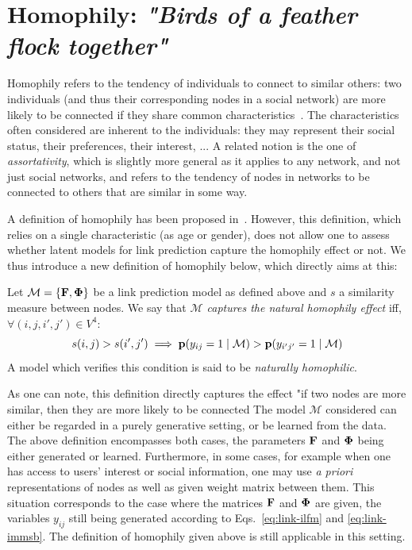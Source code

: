 \section{Homophily: \emph{"Birds of a feather flock together"}}
\label{sec:homophily}

Homophily refers to the tendency of individuals to connect to similar others: two individuals (and thus their corresponding nodes in a social network) are more likely to be connected if they share common characteristics~\cite{mcpherson2001birds,lazarsfeld1954friendship}. The characteristics often considered are inherent to the individuals: they may represent their social status, their preferences, their interest, ... A related notion is the one of {\it assortativity}, which is slightly more general as it applies to any network, and not just social networks, and refers to the tendency of nodes in networks to be connected to others that are similar in some way.

A definition of homophily has been proposed in~\cite{la2010randomization}. However, this definition, which relies on a single characteristic (as age or gender), does not allow one to assess whether latent models for link prediction capture the homophily effect or not. We thus introduce a new definition of homophily below, which directly aims at this:
%
\begin{definition}
	Let $\mathcal{M}=\{\mathbf{F},\mathbf{\Phi}\}$ be a link prediction model as defined above and $s$ a similarity measure between nodes. We say that \emph{$\mathcal{M}$ captures the natural homophily effect} iff, $\forall (i,j,i',j') \in V^4$:
%
\begin{equation}
s(i,j) > s(i',j')  \implies \mathbf{p}(y_{ij}=1 \mid \mathcal{M}) > \mathbf{p}(y_{i'j'}=1  \mid \mathcal{M}) \nonumber
\end{equation}
%
A model which verifies this condition is said to be \emph{naturally homophilic}.
\end{definition}
%
As one can note, this definition directly captures the effect "if two nodes are more similar, then they are more likely to be connected The model $\mathcal{M}$ considered can either be regarded in a purely generative setting, or be learned from the data. The above definition encompasses both cases, the parameters $\mathbf{F}$ and $\mathbf{\Phi}$ being either generated or learned. Furthermore, in some cases, for example when one has access to users' interest or social information, one may use \textit{a priori} representations of nodes as well as given weight matrix between them. This situation corresponds to the case where the matrices $\mathbf{F}$ and $\mathbf{\Phi}$ are given, the variables $y_{ij}$ still being generated according to Eqs.~\ref{eq:link-ilfm} and \ref{eq:link-immsb}. The definition of homophily given above is still applicable in this setting.

